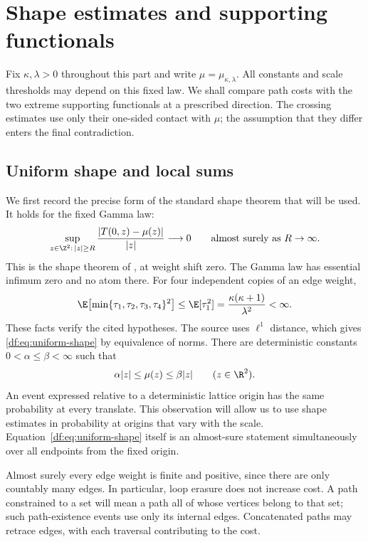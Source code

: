 \section{Shape estimates and supporting functionals}
\label{df:sec:setup}

Fix $\kappa,\lambda>0$ throughout this part and write
$\mu=\mu_{\kappa,\lambda}$. All constants and scale thresholds may
depend on this fixed law. We shall compare path costs with the two
extreme supporting functionals at a prescribed direction. The crossing
estimates use only their one-sided contact with $\mu$; the assumption
that they differ enters the final contradiction.

\subsection{Uniform shape and local sums}

We first record the precise form of the standard shape theorem that
will be used. It holds for the fixed Gamma law:
\begin{equation}\label{df:eq:uniform-shape}
 \sup_{z\in\Z^2:\,|z|\ge R}
 \frac{|T(0,z)-\mu(z)|}{|z|}\longrightarrow0
 \qquad\text{almost surely as }R\to\infty.
\end{equation}
This is the shape theorem of
\cite[Theorem~A.1 and Equation~(A.3)]{KRS23}, at weight shift zero.
The Gamma law has essential infimum zero and no atom there. For
four independent copies of an edge weight,
\[
 \E\!\left[\min\{\tau_1,\tau_2,\tau_3,\tau_4\}^2\right]
 \le \E[\tau_1^2]
 =\frac{\kappa(\kappa+1)}{\lambda^2}<\infty.
\]
These facts verify the cited hypotheses. The source uses $\ell^1$
distance, which gives \eqref{df:eq:uniform-shape} by equivalence of
norms. There are deterministic constants $0<\alpha\le\beta<\infty$ such that
\begin{equation}\label{df:eq:norm-bounds}
 \alpha|z|\le\mu(z)\le\beta|z|\qquad(z\in\R^2).
\end{equation}
An event expressed relative to a deterministic lattice origin has the
same probability at every translate. This observation will allow us to
use shape estimates in probability at origins that vary with the
scale. Equation~\eqref{df:eq:uniform-shape} itself is an almost-sure
statement simultaneously over all endpoints from the fixed origin.

Almost surely every edge weight is finite and positive, since there
are only countably many edges. In particular, loop erasure does not
increase cost. A path constrained to a set will mean a path all of
whose vertices belong to that set; such path-existence events use
only its internal edges. Concatenated paths may retrace edges, with
each traversal contributing to the cost.

